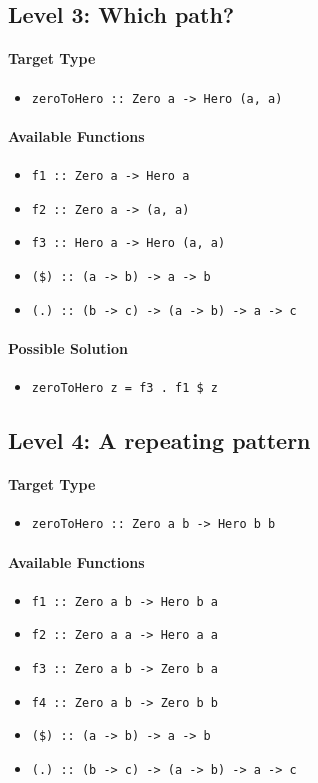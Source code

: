 \documentclass[preprint,12pt]{elsarticle}
\begin{document}
\subsection{Level 3: Which path?}
\paragraph{Target Type } 
\begin{itemize}
    \item \texttt{zeroToHero :: Zero a -> Hero (a, a)}
\end{itemize}

\paragraph{Available Functions} 
\begin{itemize}
    \item \texttt{f1 :: Zero a -> Hero a}
    \item \texttt{f2 :: Zero a -> (a, a)}
    \item \texttt{f3 :: Hero a -> Hero (a, a)}
    \item \texttt{(\$) :: (a -> b) -> a -> b}
    \item \texttt{(.) :: (b -> c) -> (a -> b) -> a -> c}
\end{itemize}

\paragraph{Possible Solution} 
\begin{itemize}
    \item \texttt{zeroToHero z = f3 . f1 \$ z}
\end{itemize}


\subsection{Level 4: A repeating pattern}
\paragraph{Target Type } 
\begin{itemize}
    \item \texttt{zeroToHero :: Zero a b -> Hero b b}
\end{itemize}

\paragraph{Available Functions} 
\begin{itemize}
    \item \texttt{f1 :: Zero a b -> Hero b a}
    \item \texttt{f2 :: Zero a a -> Hero a a}
    \item \texttt{f3 :: Zero a b -> Zero b a}
    \item \texttt{f4 :: Zero a b -> Zero b b}
    \item \texttt{(\$) :: (a -> b) -> a -> b}
    \item \texttt{(.) :: (b -> c) -> (a -> b) -> a -> c}
\end{itemize}
\end{document}
